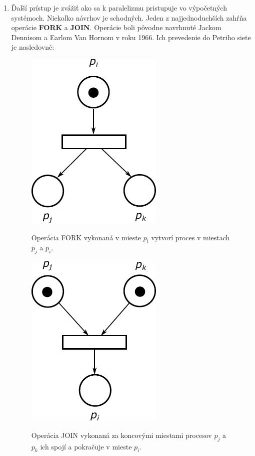 \begin{enumerate}
	\item Ďaľší prístup je zvážiť ako sa k paralelizmu pristupuje vo výpočetných systémoch. Niekoľko návrhov je schodných. Jeden z najjednoduchších zahŕňa operácie \textbf{FORK} a \textbf{JOIN}. Operácie boli pôvodne navrhnuté Jackom Dennisom a Earlom Van Hornom v roku 1966. Ich prevedenie do Petriho siete je nasledovné: 
	
	\begin{figure}[H]
		\centering
		\begin{minipage}{.4\textwidth}
			\label{fig:fork}
			\centering
			\includegraphics[scale=0.5]{obrazky-figures/PN-fork}
			\caption{Operácia FORK vykonaná v mieste $p_i$ vytvorí proces v miestach $p_j$ a $p_i$.}
		\end{minipage}
	\begin{minipage}{.05\textheight} %
		\quad
	\end{minipage}
		\begin{minipage}{.4\textwidth}
			\label{fig:join}
			\centering
			\includegraphics[scale=0.5]{obrazky-figures/PN-join}
			\caption{Operácia JOIN vykonaná za koncovými miestami procesov $p_j$ a $p_k$ ich spojí a pokračuje v mieste $p_i$.}
		\end{minipage}
	\end{figure}
	

\end{enumerate}
